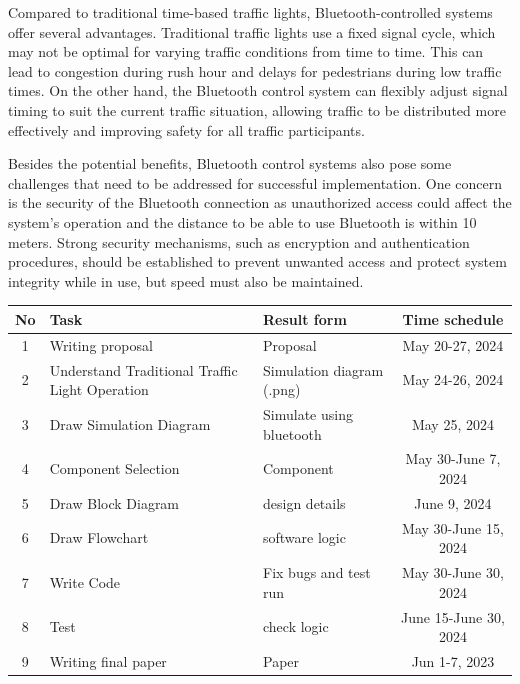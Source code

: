 \documentclass[conference, onecolumn]{IEEEtran}
\begin{document}
Compared to traditional time-based traffic lights, Bluetooth-controlled systems offer several advantages. Traditional traffic lights use a fixed signal cycle, which may not be optimal for varying traffic conditions from time to time. This can lead to congestion during rush hour and delays for pedestrians during low traffic times. On the other hand, the Bluetooth control system can flexibly adjust signal timing to suit the current traffic situation, allowing traffic to be distributed more effectively and improving safety for all traffic participants.\par

Besides the potential benefits, Bluetooth control systems also pose some challenges that need to be addressed for successful implementation. One concern is the security of the Bluetooth connection as unauthorized access could affect the system's operation and the distance to be able to use Bluetooth is within 10 meters. Strong security mechanisms, such as encryption and authentication procedures, should be established to prevent unwanted access and protect system integrity while in use, but speed must also be maintained.

\begin{table}[htbp]

\begin{center}


\begin{tabular}{|c|l|l|c|}
\hline
\textbf{No}&\textbf{Task} & \textbf{Result form}& \textbf{Time schedule} \\
\hline
1 & Writing proposal & Proposal & May 20-27, 2024 \\
\hline
2 & Understand Traditional Traffic Light Operation &Simulation diagram (.png) & May 24-26, 2024 \\
\hline
3 & Draw Simulation Diagram &Simulate using bluetooth & May 25, 2024 \\
\hline
4 & Component Selection &Component  & May 30-June 7, 2024 \\
\hline
5 & Draw Block Diagram &design details & June 9, 2024 \\
\hline
6 & Draw Flowchart &software logic & May 30-June 15, 2024 \\
\hline
7 & Write Code &Fix bugs and test run & May 30-June 30, 2024 \\
\hline
8 & Test &check logic & June 15-June 30, 2024 \\
\hline

9 & Writing final paper & Paper & Jun 1-7, 2023 \\
\hline
\end{tabular}
\label{tab1}
\end{center}
\end{table}
\end{document}
